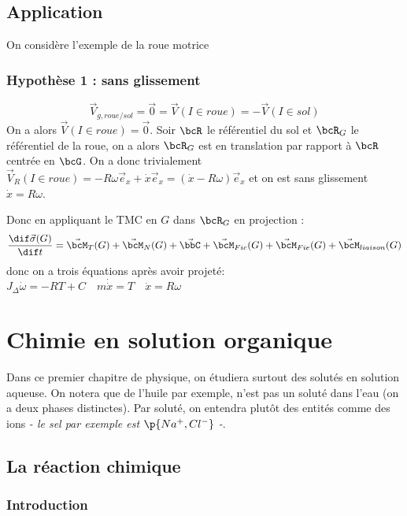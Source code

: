     \section{Application}

        On considère l'exemple de la roue motrice %
        \subsection{Hypothèse 1 : sans glissement}

            \[\vec V_{g,roue/sol} = \vec 0 = \vec V(I \in roue) = - \vec V\left( I \in sol\right)\]
            On a alors \(\vec V\left(I \in roue\right) = \vec 0\). Soir \(\bcR\) le référentiel du sol et \(\bcR_G\) le référentiel de la roue, on a alors \(\bcR_G\) est en translation par rapport à \(\bcR\) centrée en \(\bcG\). On a donc trivialement \(\vec V_R(I \in roue) = -R \omega \vec e_x + \dot{x} \vec e_x = (\dot{x} - R\omega)\vec e_x\) et on est sans glissement \(\dot x = R\omega\).

            Donc en appliquant le TMC en \(G\) dans \(\bcR_G\) en projection :
            \[ \dfrac{\dif \vec\sigma(G)}{\dif t} = \vec \bcM_T(G) + \vec \bcM_N(G) + \vec \bbC + \vec \bcM_{Fic}(G) + \vec \bcM_{Fie}(G) + \vec \bcM_{liaison}(G)\] donc on a trois équations après avoir projeté: \(J_{\Delta} \dot\omega = -RT+C \quad m\dot\dot x = T\quad \dot x = R\omega\)
            
    \chapter{Chimie en solution organique}
    
    Dans ce premier chapitre de physique, on étudiera surtout des solutés en solution aqueuse. On notera que de l'huile par exemple, n'est pas un soluté dans l'eau (on a deux phases distinctes). Par soluté, on entendra plutôt des entités comme des ions \emph{- le sel par exemple est $\p{Na^+, Cl^-}$ -}.
    
    \chaptertoc
    
    \section{La réaction chimique}
    
    \subsection{Introduction}
    
